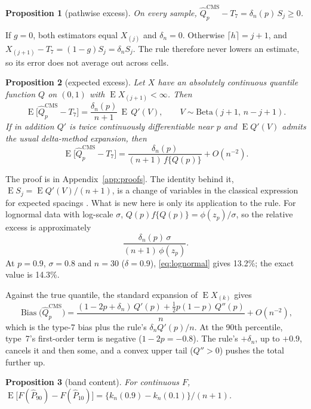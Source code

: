 \documentclass[11pt]{article}
\newtheorem{proposition}{Proposition}
\theoremstyle{remark}
\DeclareMathOperator{\E}{E}
\newcommand{\ceil}[1]{\lceil #1 \rceil}
\begin{document}
\begin{proposition}[pathwise excess]\label{prop:path}
On every sample, $\widehat Q^{\mathrm{CMS}}_p-T_7=\delta_n(p)\,S_j\ge 0$.
\end{proposition}

If $g=0$, both estimators equal $X_{(j)}$ and $\delta_n=0$. Otherwise $\ceil{h}=j+1$, and $X_{(j+1)}-T_7=(1-g)S_j=\delta_nS_j$. The rule therefore never lowers an estimate, so its error does not average out across cells.

\begin{proposition}[expected excess]\label{prop:spacing}
Let $X$ have an absolutely continuous quantile function $Q$ on $(0,1)$ with $\E X_{(j+1)}<\infty$. Then
\[
\E\big[\widehat Q^{\mathrm{CMS}}_p-T_7\big]=\frac{\delta_n(p)}{n+1}\,\E\,Q'(V),\qquad V\sim\mathrm{Beta}(j+1,\,n-j+1).
\]
If in addition $Q'$ is twice continuously differentiable near $p$ and $\E Q'(V)$ admits the usual delta-method expansion, then
\[
\E\big[\widehat Q^{\mathrm{CMS}}_p-T_7\big]=\frac{\delta_n(p)}{(n+1)\,f\{Q(p)\}}+O(n^{-2}).
\]
\end{proposition}

The proof is in Appendix~\ref{app:proofs}. The identity behind it, $\E S_j=\E Q'(V)/(n+1)$, is a change of variables in the classical expression for expected spacings \citep{pyke1965,jonesbalakrishnan2002}. What is new here is only its application to the rule. For lognormal data with log-scale $\sigma$, $Q(p)f\{Q(p)\}=\phi(z_p)/\sigma$, so the relative excess is approximately
\begin{equation}\label{eq:lognormal}
\frac{\delta_n(p)\,\sigma}{(n+1)\,\phi(z_p)} .
\end{equation}
At $p=0.9$, $\sigma=0.8$ and $n=30$ ($\delta=0.9$), \eqref{eq:lognormal} gives 13.2\%; the exact value is 14.3\%.

Against the true quantile, the standard expansion of $\E X_{(k)}$ \citep[\S4.6]{davidnagaraja2003} gives
\[
\operatorname{Bias}\big(\widehat Q^{\mathrm{CMS}}_p\big)=\frac{(1-2p+\delta_n)\,Q'(p)+\tfrac12p(1-p)\,Q''(p)}{n}+O(n^{-2}),
\]
which is the type-7 bias plus the rule's $\delta_nQ'(p)/n$. At the 90th percentile, type~7's first-order term is negative ($1-2p=-0.8$). The rule's $+\delta_n$, up to $+0.9$, cancels it and then some, and a convex upper tail ($Q''>0$) pushes the total further up.

\begin{proposition}[band content]\label{prop:band}
For continuous $F$, $\E\big[F(\widehat P_{90})-F(\widehat P_{10})\big]=\{k_n(0.9)-k_n(0.1)\}/(n+1)$.
\end{proposition}
\end{document}
